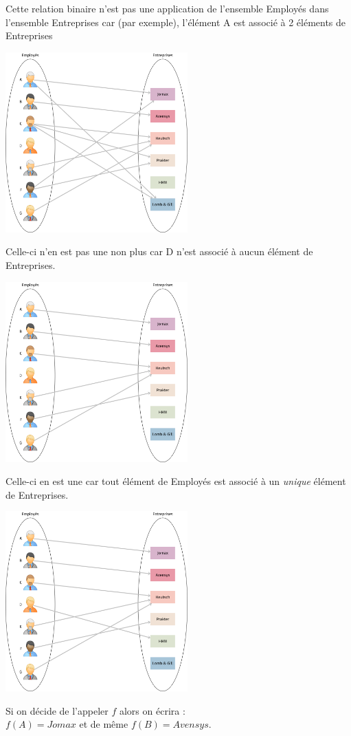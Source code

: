 \begin{exemple}[s]
    Cette relation binaire n'est pas une application de l'ensemble Employés dans l'ensemble Entreprises car (par exemple), l'élément A est associé à 2 éléments de Entreprises
    \begin{center}
        \includegraphics[width=7cm]{ensembles/img/graphe_relation_binaire.png}
    \end{center}
    Celle-ci n'en est pas une non plus car D n'est associé à aucun élément de Entreprises.
    \begin{center}
        \includegraphics[width=7cm]{ensembles/img/pas_appli.png}
    \end{center}
    Celle-ci en est une car tout élément de Employés est associé à un \textit{unique} élément de Entreprises.
    \begin{center}
        \includegraphics[width=7cm]{ensembles/img/appli.png}
    \end{center}
    Si on décide de l'appeler $f$ alors on écrira :\\$f(A)=Jomax$ et de même $f(B)=Avensys$.
\end{exemple}


